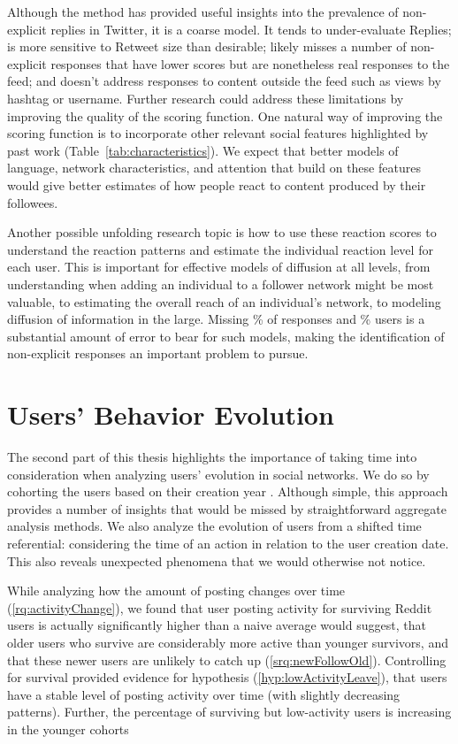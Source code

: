Although the method has provided useful insights into the prevalence of non-explicit replies in Twitter, it is a coarse model.  It tends to under-evaluate Replies; is more sensitive to Retweet size than desirable; likely misses a number of non-explicit responses that have lower scores but are nonetheless real responses to the feed; and doesn't address responses to content outside the feed such as views by hashtag or username. Further research could address these limitations by improving the quality of the scoring function.  One natural way of improving the scoring function is to incorporate other relevant social features highlighted by past work (Table~\ref{tab:characteristics}).  We expect that better models of language, network characteristics, and attention that build on these features would give better estimates of how people react to content produced by their followees.

Another possible unfolding research topic is how to use these reaction scores to understand the reaction patterns and estimate the individual reaction level for each user.  This is important for effective models of diffusion at all levels, from understanding when adding an individual to a follower network might be most valuable, to estimating the overall reach of an individual's network, to modeling diffusion of information in the large.  Missing \highNonTaggedTweetCountPct{}\% of responses and \usersAboveLinePct{}\% users is a substantial amount of error to bear for such models, making the identification of non-explicit responses an important problem to pursue.


\section{Users' Behavior Evolution}

The second part of this thesis highlights the importance of taking time into consideration when analyzing users' evolution in social networks. We do so by cohorting the users based on their creation year \cite{Barbosa2016}. Although simple, this approach provides a number of insights that would be missed by straightforward aggregate analysis methods.  We also analyze the evolution of users from a shifted time referential: considering the time of an action in relation to the user creation date. This also reveals unexpected phenomena that we would otherwise not notice.

While analyzing how the amount of posting changes over time (\ref{rq:activityChange}), we found that user posting activity for surviving Reddit users is actually significantly higher than a naive average would suggest, that older users who survive are considerably more active than younger survivors, and that these newer users are unlikely to catch up (\ref{srq:newFollowOld}).  Controlling for survival provided evidence for hypothesis (\ref{hyp:lowActivityLeave}), that users have a stable level of posting activity over time (with slightly decreasing patterns).  Further, the percentage of surviving but low-activity users is increasing in the younger cohorts 

